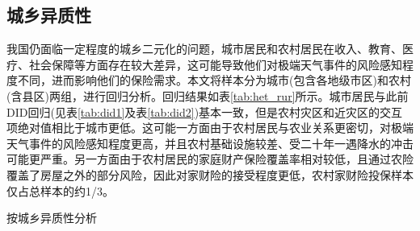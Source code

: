\subsection{城乡异质性}
我国仍面临一定程度的城乡二元化的问题，城市居民和农村居民在收入、教育、医疗、社会保障等方面存在较大差异，这可能导致他们对极端天气事件的风险感知程度不同，进而影响他们的保险需求。本文将样本分为城市(包含各地级市区)和农村(含县区)两组，进行回归分析。回归结果如表\ref{tab:het_rur}所示。城市居民与此前DID回归(见表\ref{tab:did1}及表\ref{tab:did2})基本一致，但是农村灾区和近灾区的交互项绝对值相比于城市更低。这可能一方面由于农村居民与农业关系更密切，对极端天气事件的风险感知程度更高，并且农村基础设施较差、受二十年一遇降水的冲击可能更严重。另一方面由于农村居民的家庭财产保险覆盖率相对较低，且通过农险覆盖了房屋之外的部分风险\citep{falco2014crop,胡新艳2021气候变化,TJLT202108007}，因此对家财险的接受程度更低，农村家财险投保样本仅占总样本的约1/3。

\begin{table}[ht]
    \centering
    \caption{按城乡异质性分析}\label{tab:het_rur}
    
\end{table}
